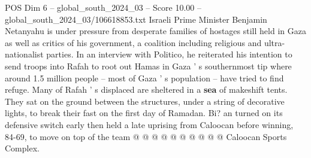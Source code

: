 \begin{textsample}{POS Dim 6 – global\_south\_2024\_03 – Score 10.00 – global\_south\_2024\_03/106618853.txt}
Israeli Prime Minister Benjamin Netanyahu is under pressure from desperate families of hostages still held in Gaza as well as critics of his government, a coalition including religious and ultra-nationalist parties.
In an interview with Politico, he reiterated his intention to send troops into Rafah to root out Hamas in Gaza ' s southernmost tip where around 1.5 million people -- most of Gaza ' s population -- have tried to find refuge.
Many of Rafah ' s displaced are sheltered in a \textbf{sea} of makeshift tents.
They sat on the ground between the structures, under a string of decorative lights, to break their fast on the first day of Ramadan.
Bi? an turned on its defensive switch early then held a late uprising from Caloocan before winning, 84-69, to move on top of the team @ @ @ @ @ @ @ @ @ @ Caloocan Sports Complex.

\end{textsample}

